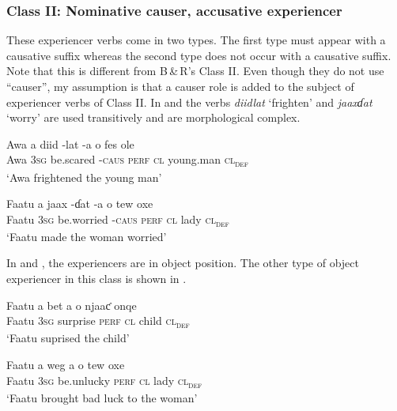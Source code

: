\documentclass[output=paper]{langscibook}
\begin{document}
\subsubsection{Class II: Nominative causer, accusative experiencer} 

These experiencer verbs come in two types. The first type must appear with a causative suffix whereas the second type does not occur with a causative suffix. Note that this is different from B\,\&\,R's Class II. Even though they do not use “causer”, my assumption is that a causer role is added to the subject of experiencer verbs of Class II. In  and  the verbs \textit{diidlat} ‘frighten’ and \textit{jaaxɗat} ‘worry’ are used transitively and are morphological complex. 

\ea \label{ex:tamba:5}
\ea \label{ex:tamba:5a}
\gll Awa  a    diid       {}-lat    -a      o     fes              ole\\
    Awa  \textsc{3sg} be.scared -\textsc{caus}   \textsc{perf}  \textsc{cl}    young.man  \textsc{cl\textsubscript{def}}\\
\glt `Awa frightened the young man'

\ex \label{ex:tamba:5b}
\gll Faatu   a       jaax       {}-ɗat    {}-a       o       tew  oxe\\
    Faatu    \textsc{3sg}   be.worried   {}-\textsc{caus}   \textsc{perf}    \textsc{cl}  lady  \textsc{cl\textsubscript{def}}\\
\glt `Faatu made the woman worried'
\z
\z

In  and , the experiencers are in  object position. The other type of object experiencer in this class is shown in .


\ea \label{ex:tamba:6}
\ea \label{ex:tamba:6a}
\gll Faatu   a        bet         a        o  njaaƈ   onqe  \\
    Faatu   \textsc{3sg}    surprise     \textsc{perf}  \textsc{cl} child   \textsc{cl\textsubscript{def}} \\
\glt `Faatu suprised the child'

\ex \label{ex:tamba:6b}
\gll Faatu  a  weg      a  o  tew    oxe\\
    Faatu  \textsc{3sg}  be.unlucky    \textsc{perf}  \textsc{cl}  lady      \textsc{cl\textsubscript{def}}\\
\glt `Faatu brought bad luck to the woman'
\z
\z 
\end{document}
